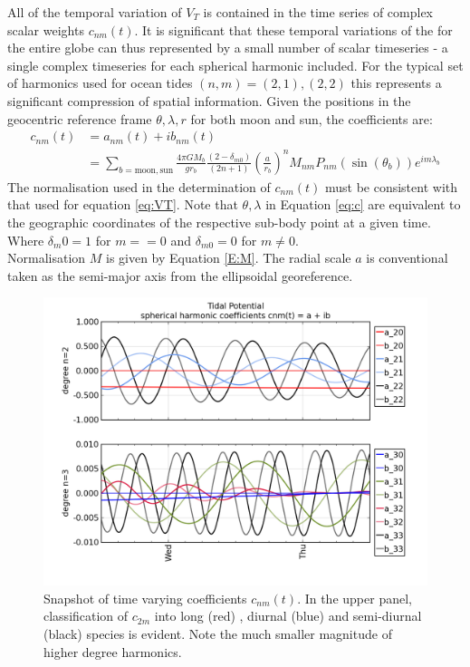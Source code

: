 All of the temporal variation of $V_T$ is contained in the time series of complex scalar weights $c_{nm}(t)$.
It is significant that these temporal variations of the \ATGP{} for the entire globe can thus represented by a small number of scalar timeseries - a single complex timeseries for each spherical harmonic included.  For the typical set of harmonics used for ocean tides $(n,m)=(2,1),(2,2)$ this represents a significant compression of spatial information.  
Given the positions in the geocentric reference frame $\theta,\lambda,r$ for both moon and sun, the coefficients are:
\begin{align}
\label{eq:c}
c_{nm}(t) &= a_{nm}(t) + ib_{nm}(t) \nonumber \\
          &= \sum_{b=\text{moon},\text{sun}}    \frac{4 \pi GM_{b}}{g r_{b}}  \frac{(2-\delta_{m0})} {(2n+1)} \left(\frac{a}{r_b} \right)^n    M_{nm} P_{nm}( \sin(\theta_b) ) e^{im\lambda_b}
\end{align}
The normalisation used in the determination of $c_{nm}(t)$ must be consistent with that used for equation \ref{eq:VT}.
Note that $\theta,\lambda$ in Equation \ref{eq:c} are equivalent to the geographic coordinates of the respective sub-body point at a given time. 
Where $\delta_m0 = 1$ for $m==0$ and $\delta_{m0} = 0$ for $m \neq 0$.\\
Normalisation $M$ is given by Equation \ref{E:M}. The radial scale $a$ is conventional taken as the semi-major axis from the ellipsoidal georeference. 
\begin{figure}[h]
\begin{center}
\includegraphics[width=\figwidthBig]{figures/plots/tidal_coeff_timeseries_2days.png}
\caption{Snapshot of time varying coefficients $c_{nm}(t)$.  In the upper panel, classification of $c_{2m}$ into long (red) , diurnal (blue) and semi-diurnal (black) species is evident.  Note the much smaller magnitude of higher degree harmonics.}
\end{center}
\end{figure}
